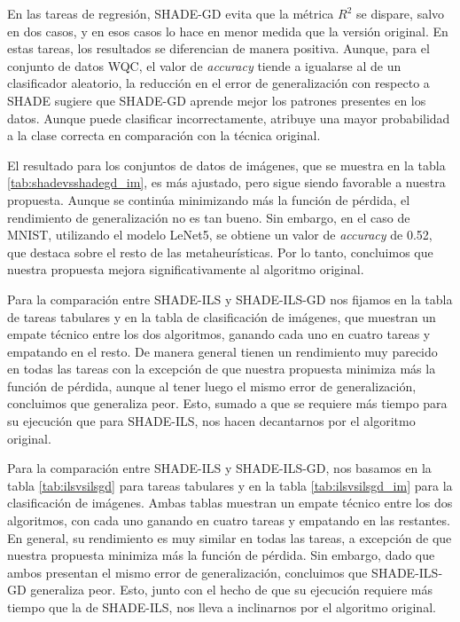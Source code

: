 En las tareas de regresión, SHADE-GD evita que la métrica $R^2$ se dispare, salvo en dos casos, y en esos casos lo hace en menor medida que la versión original. En estas tareas, los resultados se diferencian de manera positiva. Aunque, para el conjunto de datos WQC, el valor de \textit{accuracy} tiende a igualarse al de un clasificador aleatorio, la reducción en el error de generalización con respecto a SHADE sugiere que SHADE-GD aprende mejor los patrones presentes en los datos. Aunque puede clasificar incorrectamente, atribuye una mayor probabilidad a la clase correcta en comparación con la técnica original.

El resultado para los conjuntos de datos de imágenes, que se muestra en la tabla \ref{tab:shadevsshadegd_im}, es más ajustado, pero sigue siendo favorable a nuestra propuesta. Aunque se continúa minimizando más la función de pérdida, el rendimiento de generalización no es tan bueno. Sin embargo, en el caso de MNIST, utilizando el modelo LeNet5, se obtiene un valor de \textit{accuracy} de 0.52, que destaca sobre el resto de las metaheurísticas. Por lo tanto, concluimos que nuestra propuesta mejora significativamente al algoritmo original.


Para la comparación entre SHADE-ILS y SHADE-ILS-GD nos fijamos en la tabla  de tareas tabulares y en la tabla  de clasificación de imágenes, que muestran un empate técnico entre los dos algoritmos, ganando cada uno en cuatro tareas y empatando en el resto. De manera general tienen un rendimiento muy parecido en todas las tareas con la excepción de que nuestra propuesta minimiza más la función de pérdida, aunque al tener luego el mismo error de generalización, concluimos que generaliza peor. Esto, sumado a que se requiere más tiempo para su ejecución que para SHADE-ILS, nos hacen decantarnos por el algoritmo original.

Para la comparación entre SHADE-ILS y SHADE-ILS-GD, nos basamos en la tabla \ref{tab:ilsvsilsgd} para tareas tabulares y en la tabla \ref{tab:ilsvsilsgd_im} para la clasificación de imágenes. Ambas tablas muestran un empate técnico entre los dos algoritmos, con cada uno ganando en cuatro tareas y empatando en las restantes. En general, su rendimiento es muy similar en todas las tareas, a excepción de que nuestra propuesta minimiza más la función de pérdida. Sin embargo, dado que ambos presentan el mismo error de generalización, concluimos que SHADE-ILS-GD generaliza peor. Esto, junto con el hecho de que su ejecución requiere más tiempo que la de SHADE-ILS, nos lleva a inclinarnos por el algoritmo original.

